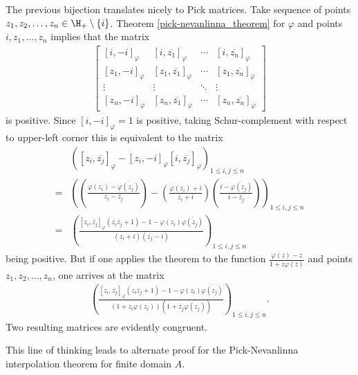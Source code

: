 The previous bijection translates nicely to Pick matrices. Take sequence of points $z_{1}, z_{2}, \ldots, z_{n} \in \H_{+} \setminus \{i\}$. Theorem \ref{pick-nevanlinna_theorem} for $\varphi$ and points $i, z_{1}, \ldots, z_{n}$ implies that the matrix
\begin{align*}
	\begin{bmatrix}
		[i, -i]_{\varphi} & [i, \overline{z_{1}}]_{\varphi} & \cdots & [i, \overline{z_{n}}]_{\varphi} \\
		[z_{1}, -i]_{\varphi} & [z_{1}, \overline{z_{1}}]_{\varphi} & \cdots & [z_{1}, \overline{z_{n}}]_{\varphi} \\
		\vdots & \vdots & \ddots & \vdots \\
		[z_{n}, -i]_{\varphi} & [z_{n}, \overline{z_{1}}]_{\varphi} & \cdots &  [z_{n}, \overline{z_{n}}]_{\varphi}
	\end{bmatrix}
\end{align*}
is positive. Since $[i, -i]_{\varphi} = 1$ is positive, taking Schur-complement with respect to upper-left corner this is equivalent to the matrix
\begin{align*}
	& \left([z_{i}, \overline{z_{j}}]_{\varphi} - [z_{i}, -i]_{\varphi}[i, \overline{z_{j}}]_{\varphi}\right)_{1 \leq i, j \leq n} \\
	=& \left(\left(\frac{\varphi(z_{i})- \overline{\varphi(z_{j})}}{z_{i} - \overline{z_{j}}}\right) - \left(\frac{\varphi(z_{i}) + i}{z_{i} + i}\right)\left(\frac{i - \overline{\varphi(z_{j})}}{i - \overline{z_{j}}}\right)\right)_{1 \leq i, j \leq n} \\
	=& \left(\frac{[z_{i}, \overline{z_{j}}]_{\varphi} (z_{i} \overline{z_{j}} + 1) - 1 - \varphi(z_{i}) \overline{\varphi(z_{j})}}{(z_{i} + i) (\overline{z_{j}} - i)}\right)_{1 \leq i, j \leq n}
\end{align*}
being positive. But if one applies the theorem to the function $\frac{\varphi(z) - z}{1 + z \varphi(z)}$ and points $z_{1}, z_{2}, \ldots, z_{n}$, one arrives at the matrix
\begin{align*}
	\left(\frac{[z_{i}, \overline{z_{j}}]_{\varphi} (z_{i} \overline{z_{j}} + 1) - 1 - \varphi(z_{i}) \overline{\varphi(z_{j})}}{(1 + z_{i} \varphi(z_{i}))(1 + \overline{z_{j}} \overline{\varphi(z_{j})})}\right)_{1 \leq i, j \leq n}.
\end{align*}
Two resulting matrices are evidently congruent.

This line of thinking leads to alternate proof for the Pick-Nevanlinna interpolation theorem for finite domain $A$.

